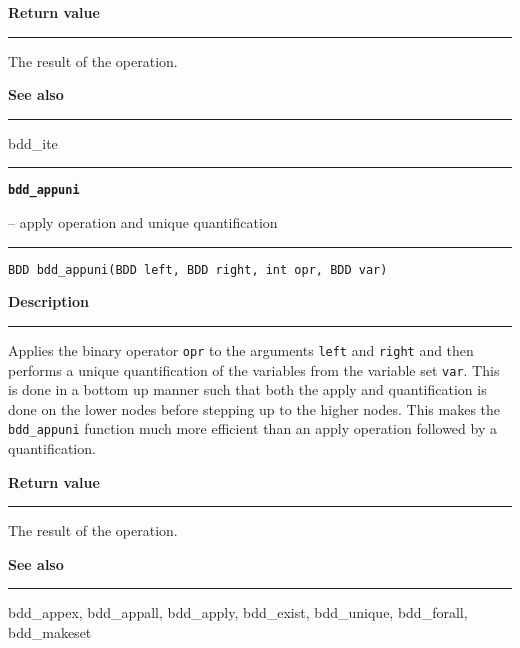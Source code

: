 \begin{minipage}{\textwidth}
\setlength{\parindent}{0em}\vspace{\parsep}\vspace{\baselineskip}\noindent
{\bf Return value}\\\rule[1.5ex]{\textwidth}{0.2mm}\vspace{-1.5ex}
The result of the operation. 

\vspace{\parsep}\vspace{\baselineskip}\noindent
{\bf See also}\\\rule[1.5ex]{\textwidth}{0.2mm}\vspace{-1.5ex}
bdd\_ite 
\end{minipage}
\vspace{8ex}
\begin{minipage}{\textwidth}

\noindent\begin{minipage}{\textwidth}
\rule{\textwidth}{0.5mm}
{\tt\bf bdd\_appuni }
\--- apply operation and unique quantification  \hspace{\fill}
\\\rule[1.5ex]{\textwidth}{0.5mm}
\end{minipage}

\noindent\begin{verbatim}
BDD bdd_appuni(BDD left, BDD right, int opr, BDD var) 
\end{verbatim}

\vspace{\parsep}\noindent
{\bf Description}\\\rule[1.5ex]{\textwidth}{0.2mm}\vspace{-1.5ex}\setlength{\parindent}{1em}
Applies the binary operator {\tt opr} to the arguments
           {\tt left} and {\tt right} and then performs a unique
	   quantification of the variables from the variable set
	   {\tt var}. This is done in a bottom up manner such that both the
	   apply and quantification is done on the lower nodes before
	   stepping up to the higher nodes. This makes the {\tt bdd\_appuni}
	   function much more efficient than an apply operation followed
	   by a quantification. 

\setlength{\parindent}{0em}\vspace{\parsep}\vspace{\baselineskip}\noindent
{\bf Return value}\\\rule[1.5ex]{\textwidth}{0.2mm}\vspace{-1.5ex}
The result of the operation. 

\vspace{\parsep}\vspace{\baselineskip}\noindent
{\bf See also}\\\rule[1.5ex]{\textwidth}{0.2mm}\vspace{-1.5ex}
bdd\_appex, bdd\_appall, bdd\_apply, bdd\_exist, bdd\_unique, bdd\_forall, bdd\_makeset 
\end{minipage}
